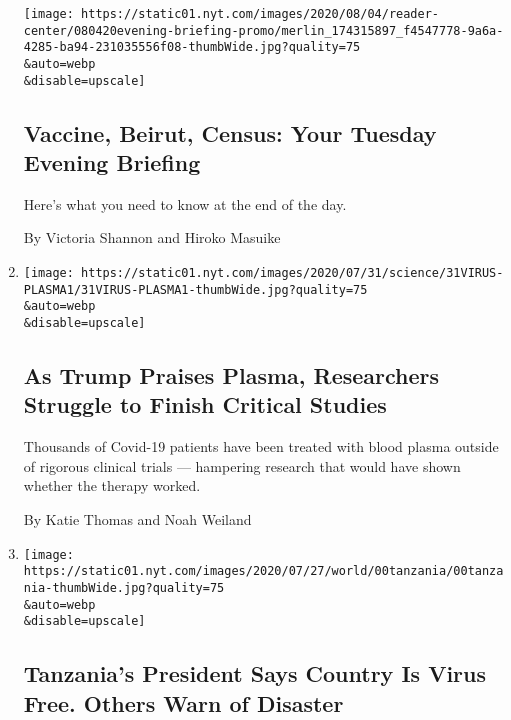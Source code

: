 \begin{enumerate}
  \texttt{[image: https://static01.nyt.com/images/2020/08/04/reader-center/080420evening-briefing-promo/merlin\_174315897\_f4547778-9a6a-4285-ba94-231035556f08-thumbWide.jpg?quality=75\\\&auto=webp\\\&disable=upscale]}

  \hypertarget{vaccine-beirut-census-your-tuesday-evening-briefing}{%
  \subsection{Vaccine, Beirut, Census: Your Tuesday Evening
  Briefing}\label{vaccine-beirut-census-your-tuesday-evening-briefing}}

  Here's what you need to know at the end of the day.

  By Victoria Shannon and Hiroko Masuike
\item
  \href{/2020/08/04/health/trump-plasma.html}{}

  \texttt{[image: https://static01.nyt.com/images/2020/07/31/science/31VIRUS-PLASMA1/31VIRUS-PLASMA1-thumbWide.jpg?quality=75\\\&auto=webp\\\&disable=upscale]}

  \hypertarget{as-trump-praises-plasma-researchers-struggle-to-finish-critical-studies}{%
  \subsection{As Trump Praises Plasma, Researchers Struggle to Finish
  Critical
  Studies}\label{as-trump-praises-plasma-researchers-struggle-to-finish-critical-studies}}

  Thousands of Covid-19 patients have been treated with blood plasma
  outside of rigorous clinical trials --- hampering research that would
  have shown whether the therapy worked.

  By Katie Thomas and Noah Weiland
\item
  \href{/2020/08/04/world/africa/tanzanias-coronavirus-president.html}{}

  \texttt{[image: https://static01.nyt.com/images/2020/07/27/world/00tanzania/00tanzania-thumbWide.jpg?quality=75\\\&auto=webp\\\&disable=upscale]}

  \hypertarget{tanzanias-president-says-country-is-virus-free-others-warn-of-disaster}{%
  \subsection{Tanzania's President Says Country Is Virus Free. Others
  Warn of
  Disaster}\label{tanzanias-president-says-country-is-virus-free-others-warn-of-disaster}}


\end{enumerate}
